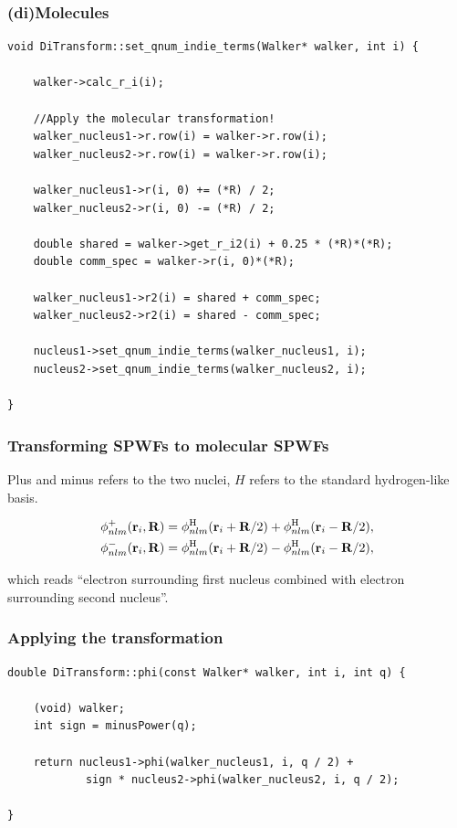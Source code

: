 \documentclass{beamer}
\begin{document}
\begin{frame}[containsverbatim]\frametitle{(di)Molecules}
\scriptsize
\begin{verbatim}
void DiTransform::set_qnum_indie_terms(Walker* walker, int i) {

    walker->calc_r_i(i);

    //Apply the molecular transformation!
    walker_nucleus1->r.row(i) = walker->r.row(i);
    walker_nucleus2->r.row(i) = walker->r.row(i);

    walker_nucleus1->r(i, 0) += (*R) / 2;
    walker_nucleus2->r(i, 0) -= (*R) / 2;

    double shared = walker->get_r_i2(i) + 0.25 * (*R)*(*R);
    double comm_spec = walker->r(i, 0)*(*R);

    walker_nucleus1->r2(i) = shared + comm_spec;
    walker_nucleus2->r2(i) = shared - comm_spec;

    nucleus1->set_qnum_indie_terms(walker_nucleus1, i);
    nucleus2->set_qnum_indie_terms(walker_nucleus2, i);

}
\end{verbatim}
\normalsize
\end{frame}
\begin{frame}\frametitle{Transforming SPWFs to molecular SPWFs}

Plus and minus refers to the two nuclei, $H$ refers to the standard hydrogen-like basis.

\begin{align}
 \phi_{nlm}^+ (\mathbf{r}_i, \mathbf{R}) &= \phi_{nlm}^\mathrm{H}(\mathbf{r}_i + \mathbf{R}/2) + \phi_{nlm}^\mathrm{H}(\mathbf{r}_i - \mathbf{R}/2)\label{eq:moleculeTransPlus},\notag \\
 \phi_{nlm}^- (\mathbf{r}_i, \mathbf{R}) &= \phi_{nlm}^\mathrm{H}(\mathbf{r}_i + \mathbf{R}/2) - \phi_{nlm}^\mathrm{H}(\mathbf{r}_i - \mathbf{R}/2)\label{eq:moleculeTransMin},\notag
\end{align}

which reads ``electron surrounding first nucleus combined with electron surrounding second nucleus''.

\end{frame}

\begin{frame}[containsverbatim]\frametitle{Applying the transformation}
\scriptsize
\begin{verbatim}
double DiTransform::phi(const Walker* walker, int i, int q) {

    (void) walker;
    int sign = minusPower(q);

    return nucleus1->phi(walker_nucleus1, i, q / 2) +
            sign * nucleus2->phi(walker_nucleus2, i, q / 2);
            
}
\end{verbatim}
\normalsize
\end{frame}
\end{document}
